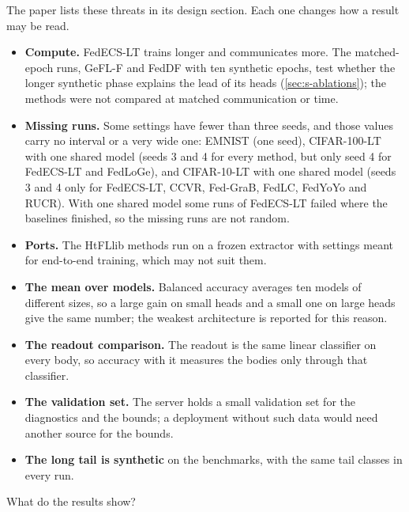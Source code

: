The paper lists these threats in its design section. Each one changes how a result may be read.
\begin{itemize}
\item \textbf{Compute.} FedECS-LT trains longer and communicates more. The matched-epoch runs, GeFL-F and FedDF with
ten synthetic epochs, test whether the longer synthetic phase explains the lead of its heads
(\cref{sec:s-ablations}); the methods were not compared at matched communication or time.
\item \textbf{Missing runs.} Some settings have fewer than three seeds, and those values carry no interval or a very
wide one: EMNIST (one seed), CIFAR-100-LT with one shared model (seeds 3 and 4 for every method, but only seed 4 for FedECS-LT and FedLoGe), and
CIFAR-10-LT with one shared model (seeds 3 and 4 only for FedECS-LT, CCVR, Fed-GraB, FedLC, FedYoYo and RUCR). With one shared model some runs of FedECS-LT failed where the baselines finished,
so the missing runs are not random.
\item \textbf{Ports.} The HtFLlib methods run on a frozen extractor with settings meant for end-to-end training, which
may not suit them.
\item \textbf{The mean over models.} Balanced accuracy averages ten models of different sizes, so a large gain on small
heads and a small one on large heads give the same number; the weakest architecture is reported for this reason.
\item \textbf{The readout comparison.} The readout is the same linear classifier on every body, so accuracy with it
measures the bodies only through that classifier.
\item \textbf{The validation set.} The server holds a small validation set for the diagnostics and the bounds; a
deployment without such data would need another source for the bounds.
\item \textbf{The long tail is synthetic} on the benchmarks, with the same tail classes in every run.
\end{itemize}

What do the results show?
